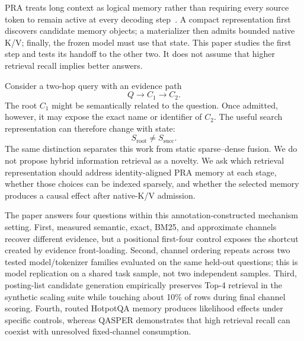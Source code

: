 \documentclass[11pt]{article}
\begin{document}
PRA treats long context as logical memory rather than requiring every source token to remain active at every decoding step~\cite{simao2026position,simao2026pra}. A compact representation first discovers candidate memory objects; a materializer then admits bounded native K/V; finally, the frozen model must use that state. This paper studies the first step and tests its handoff to the other two. It does not assume that higher retrieval recall implies better answers.

Consider a two-hop query with an evidence path
\[
Q\rightarrow C_1\rightarrow C_2.
\]
The root $C_1$ might be semantically related to the question. Once admitted, however, it may expose the exact name or identifier of $C_2$. The useful search representation can therefore change with state:
\[
S_{\mathrm{root}}\neq S_{\mathrm{succ}}.
\]
The same distinction separates this work from static sparse--dense fusion. We do not propose hybrid information retrieval as a novelty. We ask which retrieval representation should address identity-aligned PRA memory at each stage, whether those choices can be indexed sparsely, and whether the selected memory produces a causal effect after native-K/V admission.

The paper answers four questions within this annotation-constructed mechanism setting. First, measured semantic, exact, BM25, and approximate channels recover different evidence, but a positional first-four control exposes the shortcut created by evidence front-loading. Second, channel ordering repeats across two tested model/tokenizer families evaluated on the same held-out questions; this is model replication on a shared task sample, not two independent samples. Third, posting-list candidate generation empirically preserves Top-4 retrieval in the synthetic scaling suite while touching about 10\% of rows during final channel scoring. Fourth, routed HotpotQA memory produces likelihood effects under specific controls, whereas QASPER demonstrates that high retrieval recall can coexist with unresolved fixed-channel consumption.
\end{document}
